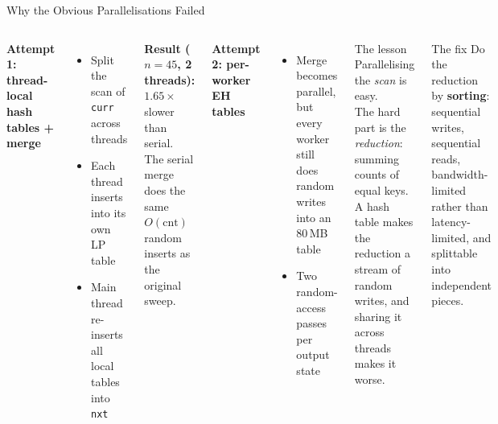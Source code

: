 \documentclass[aspectratio=169,t]{beamer}
\begin{document}
\begin{frame}{Why the Obvious Parallelisations Failed}
\footnotesize
\begin{columns}[t]
\textbf{Attempt 1: thread-local hash tables + merge}
\begin{itemize}
  \item Split the scan of \texttt{curr} across threads
  \item Each thread inserts into its own LP table
  \item Main thread re-inserts all local tables into \texttt{nxt}
\end{itemize}
\textbf{Result ($n=45$, 2 threads):} \alert{$1.65\times$ slower} than serial.\\
The serial merge does the same $O(\text{cnt})$ random inserts as the original sweep.

\vspace{0.2cm}
\textbf{Attempt 2: per-worker EH tables}
\begin{itemize}
  \item Merge becomes parallel, but every worker still does
        \alert{random writes} into an 80\,MB table
  \item Two random-access passes per output state
\end{itemize}

\begin{alertblock}{The lesson}
  Parallelising the \emph{scan} is easy.\\[2pt]
  The hard part is the \emph{reduction}: summing counts of equal keys.\\[2pt]
  A hash table makes the reduction a stream of random writes, and
  sharing it across threads makes it worse.
\end{alertblock}

\vspace{0.2cm}
\begin{block}{The fix}
  Do the reduction by \textbf{sorting}: sequential writes, sequential
  reads, bandwidth-limited rather than latency-limited, and
  splittable into independent pieces.
\end{block}
\end{columns}
\end{frame}
\end{document}
